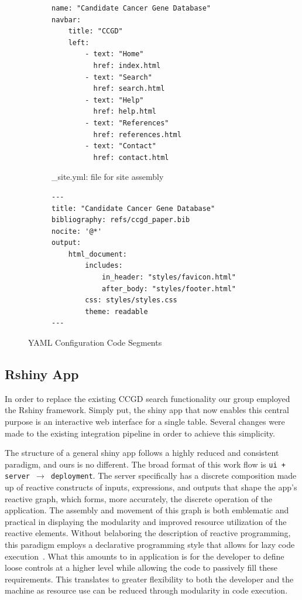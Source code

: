 \documentclass[10pt]{report}
\begin{document}
\begin{figure}
\centering
    \addtolength\tabcolsep{-0.2em}
\begin{subfigure}[b]{.5\linewidth}
    \centering
\begin{verbatim}
name: "Candidate Cancer Gene Database"
navbar:
    title: "CCGD"
    left:
        - text: "Home"
          href: index.html
        - text: "Search"
          href: search.html
        - text: "Help"
          href: help.html
        - text: "References"
          href: references.html
        - text: "Contact"
          href: contact.html
\end{verbatim}
\caption{\_site.yml: file for site assembly}\label{fig:siteYaml}
\end{subfigure}%
\begin{subfigure}[b]{.5\textwidth}
\centering
\begin{verbatim}
---
title: "Candidate Cancer Gene Database"
bibliography: refs/ccgd_paper.bib
nocite: '@*'
output:
    html_document:
        includes:
            in_header: "styles/favicon.html"
            after_body: "styles/footer.html"
        css: styles/styles.css
        theme: readable
---
\end{verbatim}
\label{fig:pageHeader}
\end{subfigure}
\caption{YAML Configuration Code Segments}\label{fig:yamls}
    \addtolength\tabcolsep{+0.2em}
\end{figure}



\subsection{Rshiny App}
In order to replace the existing CCGD search functionality our group employed the Rshiny framework. Simply put, the shiny app that now enables this central purpose is an interactive web interface for a single table. Several changes were made to the existing integration pipeline in order to achieve this simplicity.

The structure of a general shiny app follows a highly reduced and consistent paradigm, and ours is no different. The broad format of this work flow is \texttt{ui + server $\rightarrow$ deployment}. The server specifically has a discrete composition made up of reactive constructs of inputs, expressions, and outputs that shape the app's reactive graph, which forms, more accurately, the discrete operation of the application. The assembly and movement of this graph is both emblematic and practical in displaying the modularity and improved resource utilization of the reactive elements. Without belaboring the description of reactive programming, this paradigm employs a declarative programming style that allows for lazy code execution~\cite{Wickham}. What this amounts to in application is for the developer to define loose controls at a higher level while allowing the code to passively fill these requirements. This translates to greater flexibility to both the developer and the machine as resource use can be reduced through modularity in code execution.
\end{document}

